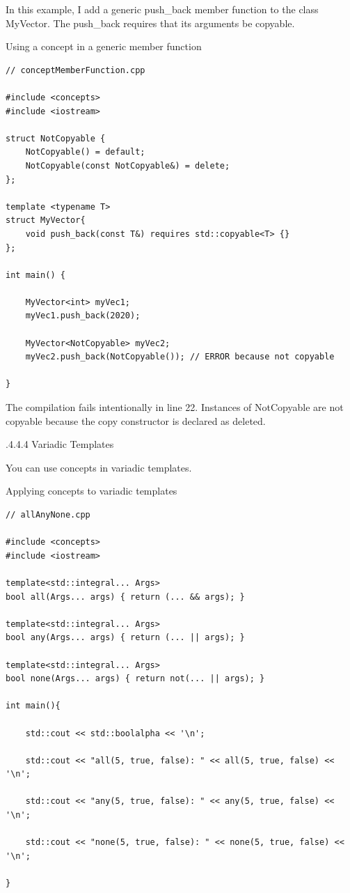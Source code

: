 In this example, I add a generic push\_back member function to the class MyVector. The push\_back requires that its arguments be copyable.

\noindent
Using a concept in a generic member function
\begin{lstlisting}[style=styleCXX]
// conceptMemberFunction.cpp

#include <concepts>
#include <iostream>

struct NotCopyable {
	NotCopyable() = default;
	NotCopyable(const NotCopyable&) = delete;
};

template <typename T>
struct MyVector{
	void push_back(const T&) requires std::copyable<T> {}
};

int main() {

	MyVector<int> myVec1;
	myVec1.push_back(2020);
	
	MyVector<NotCopyable> myVec2;
	myVec2.push_back(NotCopyable()); // ERROR because not copyable

}
\end{lstlisting}

The compilation fails intentionally in line 22. Instances of NotCopyable are not copyable because the copy constructor is declared as deleted.

.4.4.4\hspace{0.2cm} Variadic Templates

You can use concepts in variadic templates.

\noindent
Applying concepts to variadic templates
\begin{lstlisting}[style=styleCXX]
// allAnyNone.cpp

#include <concepts>
#include <iostream>

template<std::integral... Args>
bool all(Args... args) { return (... && args); }

template<std::integral... Args>
bool any(Args... args) { return (... || args); }

template<std::integral... Args>
bool none(Args... args) { return not(... || args); }

int main(){
	
	std::cout << std::boolalpha << '\n';
	
	std::cout << "all(5, true, false): " << all(5, true, false) << '\n';
	
	std::cout << "any(5, true, false): " << any(5, true, false) << '\n';
	
	std::cout << "none(5, true, false): " << none(5, true, false) << '\n';

}
\end{lstlisting}

